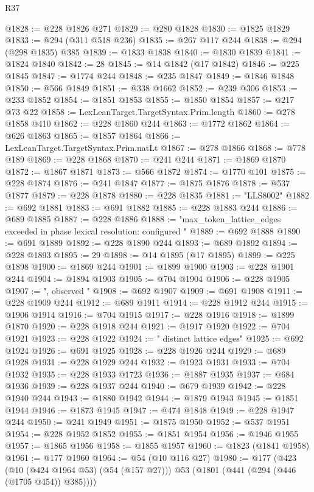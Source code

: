 \begin{lexlean}{R37}
\begin{coremodule}
@1828 := @228 @1826 @271
@1829 := @280 @1828
@1830 := @1825 @1829
@1833 := @294 (@311 @518 @236)
@1835 := @267 @117 @244
@1838 := @294 (@298 @1835) @385
@1839 := @1833 @1838
@1840 := @1830 @1839
@1841 := @1824 @1840
@1842 := 28
@1845 := @14 @1842 (@17 @1842)
@1846 := @225 @1845
@1847 := @1774 @244
@1848 := @235 @1847
@1849 := @1846 @1848
@1850 := @566 @1849
@1851 := @338 @1662
@1852 := @239 @306
@1853 := @233 @1852
@1854 := @1851 @1853
@1855 := @1850 @1854
@1857 := @217 @73 @22
@1858 := LexLeanTarget.TargetSyntax.Prim.length
@1860 := @278 @1858 @410
@1862 := @228 @1860 @244
@1863 := @1772 @1862
@1864 := @626 @1863
@1865 := @1857 @1864
@1866 := LexLeanTarget.TargetSyntax.Prim.natLt
@1867 := @278 @1866
@1868 := @778 @189
@1869 := @228 @1868
@1870 := @241 @244
@1871 := @1869 @1870
@1872 := @1867 @1871
@1873 := @566 @1872
@1874 := @1770 @101
@1875 := @228 @1874
@1876 := @241 @1847
@1877 := @1875 @1876
@1878 := @537 @1877
@1879 := @228 @1878
@1880 := @228 @1835
@1881 := "LLS8002"
@1882 := @692 @1881
@1883 := @691 @1882
@1885 := @228 @1883 @244
@1886 := @689 @1885
@1887 := @228 @1886
@1888 := "max_token_lattice_edges exceeded in phase lexical resolution: configured "
@1889 := @692 @1888
@1890 := @691 @1889
@1892 := @228 @1890 @244
@1893 := @689 @1892
@1894 := @228 @1893
@1895 := 29
@1898 := @14 @1895 (@17 @1895)
@1899 := @225 @1898
@1900 := @1869 @244
@1901 := @1899 @1900
@1903 := @228 @1901 @244
@1904 := @1894 @1903
@1905 := @704 @1904
@1906 := @228 @1905
@1907 := ", observed "
@1908 := @692 @1907
@1909 := @691 @1908
@1911 := @228 @1909 @244
@1912 := @689 @1911
@1914 := @228 @1912 @244
@1915 := @1906 @1914
@1916 := @704 @1915
@1917 := @228 @1916
@1918 := @1899 @1870
@1920 := @228 @1918 @244
@1921 := @1917 @1920
@1922 := @704 @1921
@1923 := @228 @1922
@1924 := " distinct lattice edges"
@1925 := @692 @1924
@1926 := @691 @1925
@1928 := @228 @1926 @244
@1929 := @689 @1928
@1931 := @228 @1929 @244
@1932 := @1923 @1931
@1933 := @704 @1932
@1935 := @228 @1933 @1723
@1936 := @1887 @1935
@1937 := @684 @1936
@1939 := @228 @1937 @244
@1940 := @679 @1939
@1942 := @228 @1940 @244
@1943 := @1880 @1942
@1944 := @1879 @1943
@1945 := @1851 @1944
@1946 := @1873 @1945
@1947 := @474 @1848
@1949 := @228 @1947 @244
@1950 := @241 @1949
@1951 := @1875 @1950
@1952 := @537 @1951
@1954 := @228 @1952 @1852
@1955 := @1851 @1954
@1956 := @1946 @1955
@1957 := @1865 @1956
@1958 := @1855 @1957
@1960 := @1823 (@1841 @1958)
@1961 := @177 @1960
@1964 := @54 (@10 @116 @27)
@1980 := @177
    (@423
      (@10 (@424 @1964 @53) (@54 (@157 @27)))
      @53
      (@1801 (@441 (@294 (@446 (@1705 @454)) @385))))

\end{coremodule}
\end{lexlean}
